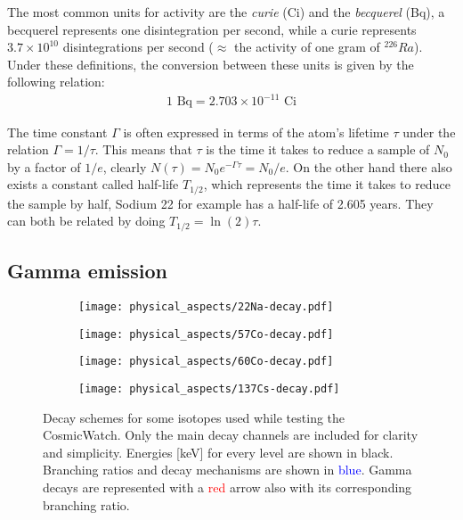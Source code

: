 The most common units for activity are the \textit{curie} (Ci) and the \textit{becquerel} (Bq), a becquerel represents one disintegration per second, while a curie represents $3.7\times10^{10}$ disintegrations per second ($\approx$ the activity of one gram of $^{226}Ra$). Under these definitions, the conversion between these units is given by the following relation:
\begin{eqnarray}
    1 \text{~Bq} = 2.703\times10^{-11} \text{~Ci}
\end{eqnarray}

The time constant $\Gamma$ is often expressed in terms of the atom's lifetime $\tau$ under the relation $\Gamma=1/\tau$. This means that $\tau$ is the time it takes to reduce a sample of $N_0$ by a factor of $1/e$, clearly $N(\tau)=N_0e^{-\Gamma \tau} = N_0/e$. On the other hand there also exists a constant called half-life $T_{1/2}$, which represents the time it takes to reduce the sample by half, Sodium 22 for example has a half-life of 2.605 years. They can both be related by doing $T_{1/2} = \ln (2)\tau$.

\subsection{Gamma emission}

\begin{figure}
  \centering
  \begin{subfigure}[t]{0.45\textwidth}
    \texttt{[image: physical\_aspects/22Na-decay.pdf]}
    \caption{\label{sfig:22Na}}
  \end{subfigure}
  \begin{subfigure}[t]{0.425\textwidth}
    \texttt{[image: physical\_aspects/57Co-decay.pdf]}
    \caption{\label{sfig:57Co}}
  \end{subfigure}
  \medskip
  \centering
  \begin{subfigure}[t]{0.425\textwidth}
    \texttt{[image: physical\_aspects/60Co-decay.pdf]}
    \caption{\label{sfig:60Co}}
  \end{subfigure}
  \begin{subfigure}[t]{0.425\textwidth}
    \texttt{[image: physical\_aspects/137Cs-decay.pdf]}
    \caption{\label{sfig:137Cs}}
  \end{subfigure}
  \caption{\label{fig:decay_schemes}Decay schemes for some isotopes used while testing the CosmicWatch. Only the main decay channels are included for clarity and simplicity. Energies [\unit{\kilo\eV}] for every level are shown in black. Branching ratios and decay mechanisms are shown in \textcolor{blue}{blue}. Gamma decays are represented with a \textcolor{red}{red} arrow also with its corresponding branching ratio.}
\end{figure}

